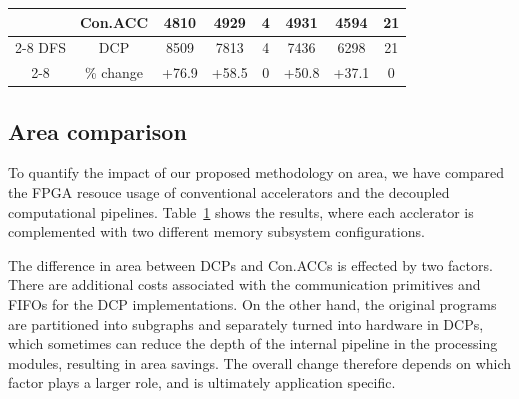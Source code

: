 \begin{table}[htbp]
\begin{tabular}{| c | c | c | c | c | c | c | c| }
  \hline                                                                                                           
\multirow{3}{*}{}&Con.ACC  & 4810 &4929 &4 & 4931 & 4594 & 21  \\
\cline{2-8}                                                                                                                                                    
DFS &DCP       & 8509 & 7813& 4 & 7436  &6298 & 21\\
\cline{2-8}                                                                                                             
       &\% change & +76.9 &+58.5 & 0 & +50.8  & +37.1 & 0  \\
  \hline                                                                                                           

\end{tabular}
\label{tab:areacom}
\end{table}







\subsection{Area comparison}
To quantify the impact of our proposed methodology on area, 
we have compared the FPGA resouce usage of conventional accelerators and
the decoupled computational pipelines.
Table~\ref{tab:areacom} shows the results, 
where each acclerator is complemented with two different memory subsystem configurations.

The difference in area between DCPs and Con.ACCs is effected by
two factors.  There are additional costs associated with the communication primitives 
and FIFOs for the DCP implementations. 
On the other hand,   
the original programs are partitioned into subgraphs and separately turned into hardware
in DCPs, which sometimes can reduce the depth of the internal 
pipeline in the processing modules, resulting in area savings. 
The overall change therefore depends on which factor plays a larger role, and is 
ultimately application specific. 